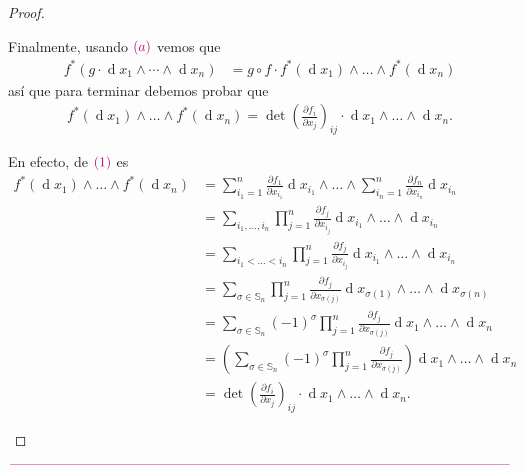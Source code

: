 \documentclass[11pt]{article}
\newcommand{\Ss}{\mathbb{S}}
\renewcommand{\d}{\operatorname{d}}
\newcommand{\paint}[1]{\color{color}{#1}}
\begin{document}
\begin{proof}
\begin{itemize}[listparindent = \parindent]
Finalmente, usando $\paint{(a)}$ vemos que
\begin{align*}
f^*(g\cdot\d x_1\wedge\cdots\wedge\d x_n) &= g \circ f \cdot f^*(\d x_1)\wedge\dots\wedge f^*(\d x_n)
\end{align*}
así que para terminar debemos probar que
\begin{align*}
f^*(\d x_1)\wedge\dots\wedge f^*(\d x_n) = \det\left(\frac{\partial f_i}{\partial x_j}\right)_{ij} \cdot  \d x_1 \wedge\dots\wedge\d x_n.
\end{align*}

En efecto, de $\paint{(1)}$ es
\begin{align*}
f^*(\d x_1)\wedge\dots\wedge f^*(\d x_n) &= \sum_{i_1=1}^n\frac{\partial f_1}{\partial x_{i_1}}\d {x_{i_1}} \wedge \dots \wedge \sum_{i_n=1}^n\frac{\partial f_n}{\partial x_{i_n}}\d {x_{i_n}}\\
&= \sum_{i_1, \dots, i_n}\prod_{j=1}^n\frac{\partial f_j}{\partial x_{i_j}} \d x_{i_1} \wedge\dots\wedge \d x_{i_n}\\
&= \sum_{i_1 < \dots < i_n} \prod_{j=1}^n\frac{\partial f_j}{\partial x_{i_j}} \d x_{i_1} \wedge\dots\wedge \d x_{i_n}\\
&= \sum_{\sigma \in \Ss_n} \prod_{j=1}^n\frac{\partial f_j}{\partial x_{\sigma(j)}} \d x_{\sigma(1)} \wedge\dots\wedge \d x_{\sigma(n)}\\
&= \sum_{\sigma \in \Ss_n} (-1)^\sigma \prod_{j=1}^n\frac{\partial f_j}{\partial x_{\sigma(j)}} \d x_1 \wedge\dots\wedge \d x_n\\
&= \left(\sum_{\sigma \in \Ss_n} (-1)^\sigma \prod_{j=1}^n\frac{\partial f_j}{\partial x_{\sigma(j)}}\right) \d x_1 \wedge\dots\wedge \d x_n\\
&= \det\left(\frac{\partial f_i}{\partial x_j}\right)_{ij} \cdot  \d x_1 \wedge\dots\wedge\d x_n.
\end{align*}
\end{itemize}
\end{proof}

\begin{center}
$\paint{
\rule{400pt}{0.5pt}
}$
\vspace{10pt}
\end{center}
\end{document}
